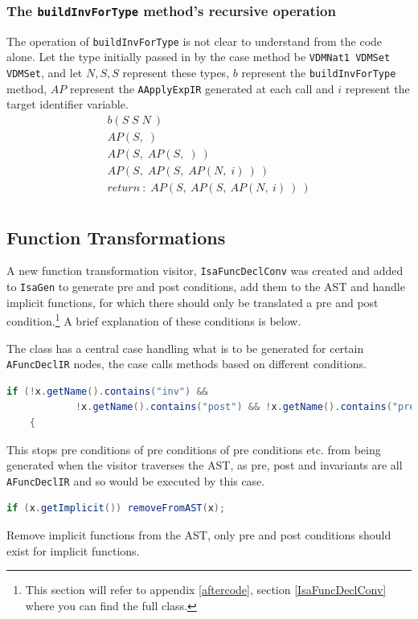 	\subsubsection{The  \lstinline[language=Java]{buildInvForType} method's recursive operation}
	The operation of  \lstinline[language=Java]{buildInvForType} is not clear to understand from the code alone. Let the type initially passed in by the case method be  \lstinline[language=Java]{VDMNat1 VDMSet VDMSet}, and let $N, S, S$ represent these types, $b$ represent the  \lstinline[language=Java]{buildInvForType} method, $AP$ represent the  \lstinline[language=Java]{AApplyExpIR} generated at each call and $i$ represent the target identifier variable.
	\begin{align}
		b(S\; S\; N\:)\\
		AP(S,\;)\\
		AP(S,\;AP(S,\;)\:)\\
		AP(S,\;AP(S,\;AP(N,\;i)\:)\:)\\
		return\:\colon\; AP(S,\:AP(S,\:AP(N,\:i)\:)\:)\\
	\end{align}
	\subsection{Function Transformations}
	A new function transformation visitor, \lstinline[language=Java]{IsaFuncDeclConv} was created and added to \lstinline[language=Java]{IsaGen} to generate pre and post conditions, add them to the AST and handle implicit functions, for which there should only be translated a pre and post condition.\footnote{This section will refer to appendix \ref{aftercode}, section \ref{IsaFuncDeclConv} where you can find the full class.} A brief explanation of these conditions is below.

	The class has a central case handling what is to be generated for certain \lstinline[language=Java]{AFuncDeclIR} nodes, the case calls methods based on different conditions.
	\begin{lstlisting}[language=Java]
	if (!x.getName().contains("inv") && 
			!x.getName().contains("post") && !x.getName().contains("pre"))
	{
	\end{lstlisting}
	This stops pre conditions of pre conditions of pre conditions etc. from being generated when the visitor traverses the AST, as pre, post and invariants are all \lstinline[language=Java]{AFuncDeclIR} and so would be executed by this case.
	\begin{lstlisting}[language=Java]
	if (x.getImplicit()) removeFromAST(x);
	\end{lstlisting}
	Remove implicit functions from the AST, only pre and post conditions should exist for implicit functions.

